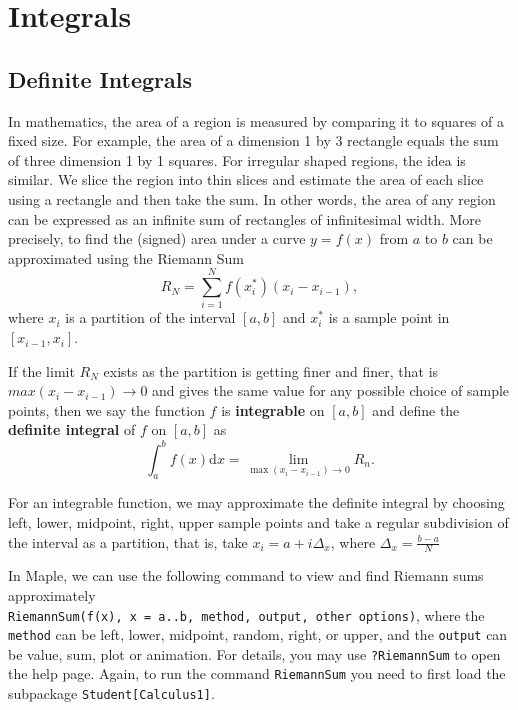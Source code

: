 \documentclass[en,11pt,simple]{elegantbook}
\begin{document}
\hypertarget{integrals}{%
\chapter{Integrals}\label{integrals}}

\hypertarget{definite-integrals}{%
\section{Definite Integrals}\label{definite-integrals}}

In mathematics, the area of a region is measured by comparing it to squares of a fixed size. For example, the area of a dimension 1 by 3 rectangle equals the sum of three dimension 1 by 1 squares. For irregular shaped regions, the idea is similar. We slice the region into thin slices and estimate the area of each slice using a rectangle and then take the sum. In other words, the area of any region can be expressed as an infinite sum of rectangles of infinitesimal width. More precisely, to find the (signed) area under a curve \(y=f(x)\) from \(a\) to \(b\) can be approximated using the Riemann Sum
\[
R_N=\sum _{i=1}^{N}f(x_i^*)(x_i-x_{i-1}),
\]
where \(x_i\) is a partition of the interval \([a,b]\) and \(x_i^*\) is a sample point in \([x_{i-1}, x_i]\).

If the limit \(R_N\) exists as the partition is getting finer and finer, that is \(max(x_i-x_{i-1})\to 0\) and gives the same value for any possible choice of sample points, then we say the function \(f\) is \textbf{integrable} on \([a, b]\) and define the \textbf{definite integral} of \(f\) on \([a, b]\) as
\[
\int_a^bf(x)\mathrm{d} x= \lim\limits_{\max(x_i-x_{i-1})\to 0}R_n.
\]

For an integrable function, we may approximate the definite integral by choosing left, lower, midpoint, right, upper sample points and take a regular subdivision of the interval as a partition, that is, take \(x_i=a+i\Delta_x\), where \(\Delta_x=\frac{b-a}{N}\)

In Maple, we can use the following command to view and find Riemann sums approximately
\texttt{RiemannSum(f(x),\ x\ =\ a..b,\ method,\ output,\ other\ options)}, where the \texttt{method} can be left, lower, midpoint, random, right, or upper, and the \texttt{output} can be value, sum, plot or animation. For details, you may use \texttt{?RiemannSum} to open the help page.
Again, to run the command \texttt{RiemannSum} you need to first load the subpackage \texttt{Student{[}Calculus1{]}}.
\end{document}
